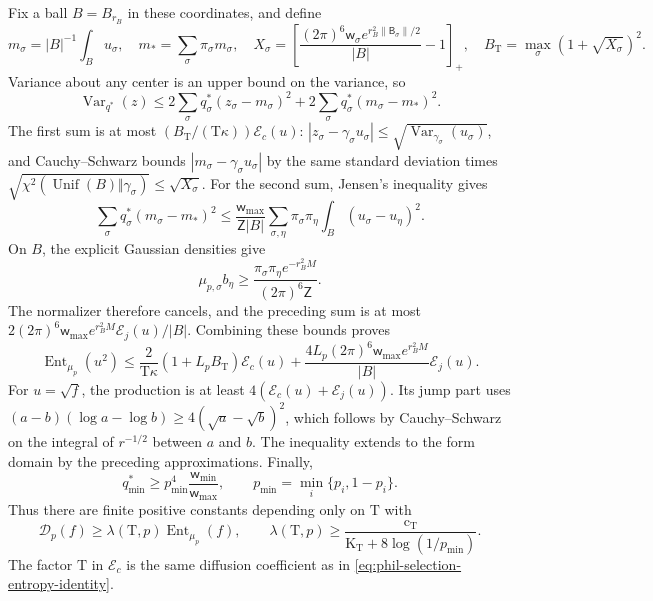 Fix a ball \(B=B_{r_B}\) in these coordinates, and define
\[
 m_\sigma=|B|^{-1}\int_Bu_\sigma,
 \quad m_* =\sum_\sigma\pi_\sigma m_\sigma,
 \quad X_\sigma=
 \left[\frac{(2\pi)^6\mathsf w_\sigma
                   e^{r_B^2\|\mathsf B_\sigma\|/2}}{|B|}-1\right]_+,
 \quad B_{\mathrm T}=\max_\sigma(1+\sqrt{X_\sigma})^2.
\]
Variance about any center is an upper bound on the variance, so
\[
 \operatorname{Var}_{q^*}(z)
 \le2\sum_\sigma q_\sigma^*(z_\sigma-m_\sigma)^2
     +2\sum_\sigma q_\sigma^*(m_\sigma-m_*)^2.
\]
The first sum is at most \((B_{\mathrm T}/(\mathrm T\kappa))\mathscr E_c(u)\):
\(|z_\sigma-\gamma_\sigma u_\sigma|\le
\sqrt{\operatorname{Var}_{\gamma_\sigma}(u_\sigma)}\), and
Cauchy--Schwarz bounds \(|m_\sigma-\gamma_\sigma u_\sigma|\) by the same
standard deviation times
\(\sqrt{\chi^2(\operatorname{Unif}(B)\Vert\gamma_\sigma)}
\le\sqrt{X_\sigma}\).
For the second sum, Jensen's inequality gives
\[
 \sum_\sigma q_\sigma^*(m_\sigma-m_*)^2
 \le\frac{\mathsf w_{\max}}
              {\mathsf Z|B|}
       \sum_{\sigma,\eta}\pi_\sigma\pi_\eta
                          \int_B(u_\sigma-u_\eta)^2.
\]
On \(B\), the explicit Gaussian densities give
\[
 \mu_{p,\sigma}b_\eta
 \ge\frac{\pi_\sigma\pi_\eta e^{-r_B^2M}}
              {(2\pi)^6\mathsf Z}.
\]
The normalizer therefore cancels, and the preceding sum is at most
\(2(2\pi)^6\mathsf w_{\max}e^{r_B^2M}
 \mathscr E_j(u)/|B|\).
Combining these bounds proves
\[
 \operatorname{Ent}_{\mu_p}(u^2)
 \le\frac2{\mathrm T\kappa}(1+L_pB_{\mathrm T})\mathscr E_c(u)
    +\frac{4L_p(2\pi)^6\mathsf w_{\max}e^{r_B^2M}}{|B|}
                                                       \mathscr E_j(u).
\]
For \(u=\sqrt f\), the production is at least
\(4(\mathscr E_c(u)+\mathscr E_j(u))\). Its jump part uses
\((a-b)(\log a-\log b)\ge4(\sqrt a-\sqrt b)^2\), which follows by
Cauchy--Schwarz on the integral of \(r^{-1/2}\) between \(a\) and \(b\).
The inequality extends to the form domain by the preceding approximations.
Finally,
\[
 q_{\min}^*\ge p_{\min}^4
                 \frac{\mathsf w_{\min}}
                      {\mathsf w_{\max}},\qquad
 p_{\min}=\min_i\{p_i,1-p_i\}.
\]
Thus there are finite positive constants depending only on \(\mathrm T\)
with
\begin{equation}
 \mathscr D_p(f)\ge\lambda(\mathrm T,p)
                         \operatorname{Ent}_{\mu_p}(f),\qquad
 \lambda(\mathrm T,p)\ge
 \frac{\mathrm c_{\mathrm T}}
      {\mathrm K_{\mathrm T}+8\log(1/p_{\min})}.
\label{eq:phil-selection-entropy-contraction}
\end{equation}
The factor \(\mathrm T\) in \(\mathscr E_c\) is the same diffusion
coefficient as in \cref{eq:phil-selection-entropy-identity}.

